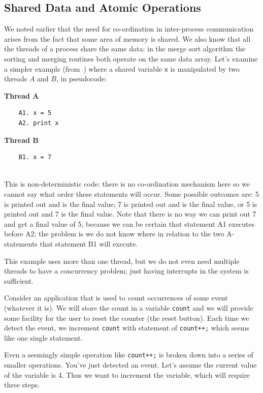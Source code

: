 \documentclass[a4paper]{report}
\begin{document}
\subsection*{Shared Data and Atomic Operations}
We noted earlier that the need for co-ordination in inter-process communication arises from the fact that some area of memory is shared. We also know that all the threads of a process share the same data: in the merge sort algorithm the sorting and merging routines both operate on the same data array. Let's examine a simpler example (from~\cite{lbs}) where a shared variable \texttt{x} is manipulated by two threads $A$ and $B$, in pseudocode:

\begin{multicols}{2}
	\textbf{Thread A}\vspace{-2em}
	\begin{verbatim}
	A1. x = 5
	A2. print x
	\end{verbatim}
	\columnbreak
	\textbf{Thread B}\vspace{-2em}
	\begin{verbatim}
	B1. x = 7
	
	\end{verbatim}
\end{multicols}

This is non-deterministic code: there is no co-ordination mechanism here so we cannot say what order these statements will occur. Some possible outcomes are: 5 is printed out and is the final value; 7 is printed out and is the final value, or 5 is printed out and 7 is the final value. Note that there is no way we can print out 7 and get a final value of 5, because we can be certain that statement A1 executes before A2; the problem is we do not know where in relation to the two A-statements that statement B1 will execute.

This example uses more than one thread, but we do not even need multiple threads to have a concurrency problem; just having interrupts in the system is sufficient.

Consider an application that is used to count occurrences of some event (whatever it is). We will store the count in a variable \texttt{count} and we will provide some facility for the user to reset the counter (the reset button). Each time we detect the event, we increment \texttt{count} with statement of \texttt{count++;} which seems like one single statement.

Even a seemingly simple operation like \texttt{count++;} is broken down into a series of smaller operations. You've just detected an event. Let's assume the current value of the variable is 4. Thus we want to increment the variable, which will require three steps.
\end{document}
